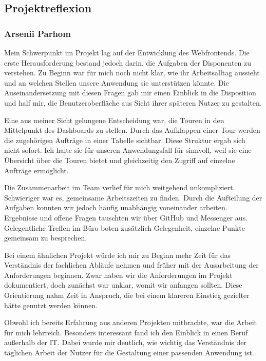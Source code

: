 \subsection{Projektreflexion}

\subsubsection{Arsenii Parhom}
\nopagebreak

Mein Schwerpunkt im Projekt lag auf der Entwicklung des Webfrontends. Die erste
Herausforderung bestand jedoch darin, die Aufgaben der Disponenten zu verstehen.
Zu Beginn war für mich noch nicht klar, wie ihr Arbeitsalltag aussieht und an
welchen Stellen unsere Anwendung sie unterstützen könnte. Die Auseinandersetzung
mit diesen Fragen gab mir einen Einblick in die Disposition und half mir, die
Benutzeroberfläche aus Sicht ihrer späteren Nutzer zu gestalten.

Eine aus meiner Sicht gelungene Entscheidung war, die Touren in den Mittelpunkt
des Dashboards zu stellen. Durch das Aufklappen einer Tour werden die zugehörigen
Aufträge in einer Tabelle sichtbar. Diese Struktur ergab sich nicht sofort. Ich
halte sie für unseren Anwendungsfall für sinnvoll, weil sie eine Übersicht über
die Touren bietet und gleichzeitig den Zugriff auf einzelne Aufträge ermöglicht.

Die Zusammenarbeit im Team verlief für mich weitgehend unkompliziert. Schwieriger
war es, gemeinsame Arbeitszeiten zu finden. Durch die Aufteilung der Aufgaben
konnten wir jedoch häufig unabhängig voneinander arbeiten. Ergebnisse und offene
Fragen tauschten wir über GitHub und Messenger aus. Gelegentliche Treffen im Büro
boten zusätzlich Gelegenheit, einzelne Punkte gemeinsam zu besprechen.

Bei einem ähnlichen Projekt würde ich mir zu Beginn mehr Zeit für das Verständnis
der fachlichen Abläufe nehmen und früher mit der Ausarbeitung der Anforderungen
beginnen. Zwar haben wir die Anforderungen im Projekt dokumentiert, doch zunächst
war unklar, womit wir anfangen sollten. Diese Orientierung nahm Zeit in Anspruch,
die bei einem klareren Einstieg gezielter hätte genutzt werden können.

Obwohl ich bereits Erfahrung aus anderen Projekten mitbrachte, war die Arbeit für
mich lehrreich. Besonders interessant fand ich den Einblick in einen Beruf
außerhalb der IT. Dabei wurde mir deutlich, wie wichtig das Verständnis der
täglichen Arbeit der Nutzer für die Gestaltung einer passenden Anwendung ist.

